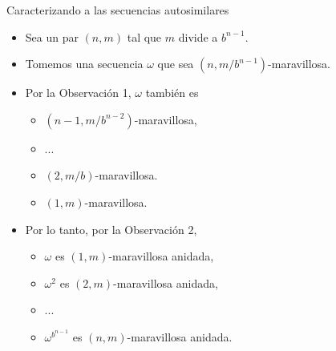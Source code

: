 \documentclass[spanish,xcolor={table}]{beamer}
\begin{document}
\begin{frame}{Caracterizando a las secuencias autosimilares}

\begin{itemize}
  \item Sea un par $(n,m)$ tal que $m$ divide a $b^{n-1}$.
  \item Tomemos una secuencia $\omega$ que sea $(n, m/b^{n-1})$-maravillosa.
  \pause
  \item Por la Observación 1, $\omega$ también es
  \begin{itemize}
    \item $(n-1, m/b^{n-2})$-maravillosa,
    \item ...
    \item $(2, m/b)$-maravillosa.
    \item $(1, m)$-maravillosa.
  \end{itemize}
  \pause
  \item Por lo tanto, por la Observación 2,
  \begin{itemize}
    \item $\omega$ es $(1, m)$-maravillosa anidada,
    \item $\omega^2$ es $(2, m)$-maravillosa anidada,
    \item ...
    \item $\omega^{b^{n-1}}$ es $(n, m)$-maravillosa anidada.
  \end{itemize}
\end{itemize}

\end{frame}

\end{document}
